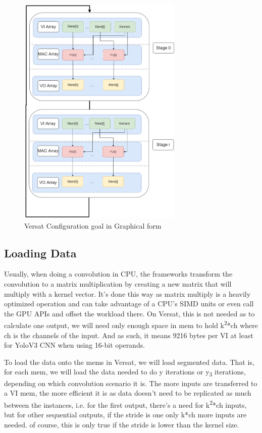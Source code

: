 \begin{figure}[!htbp]
    \centering
    \includegraphics[width=0.7\textwidth]{Figures/Convolution.drawio.png}
    \caption{Versat Configuration goal in Graphical form}
    \label{VersatConfiguration}
\end{figure}

\subsection{Loading Data}

Usually, when doing a convolution in CPU, the frameworks transform the convolution to a matrix multiplication by creating a new matrix that will multiply with a
kernel vector. It's done this way as matrix multiply is a heavily optimized operation and can take advantage of a CPU's SIMD units or even call the GPU APIs
and offset the workload there. On Versat, this is not needed as to calculate one output, we will need only enough space in mem to hold
k\textsuperscript{2}*ch where ch is the channels of the input. And as such, it means 9216 bytes per VI at least for YoloV3 CNN when using 16-bit operands.

To load the data onto the mems in Versat, we will load segmented data. That is, for each mem, we will load the data
needed to do y iterations or y\textsubscript{3} iterations, depending on which convolution scenario it is.
The more inputs are transferred to a VI mem, the more efficient it is as data doesn't need to be replicated as much between the instances,
i.e. for the first output, there's a need for k\textsuperscript{2}*ch inputs, but for other sequential outputs, if the stride is one only k*ch more inputs are needed.
of course, this is only true if the stride is lower than the kernel size.

